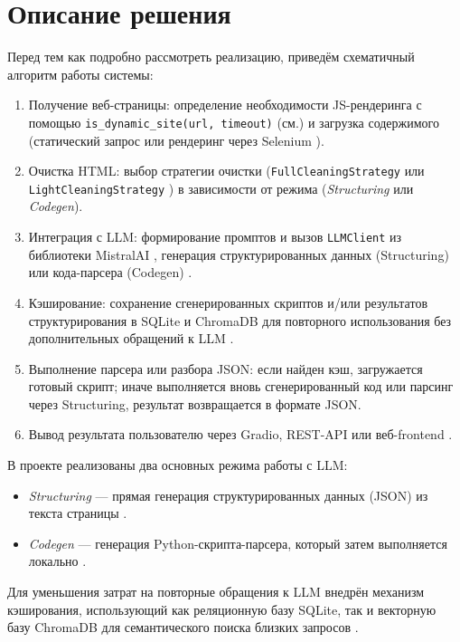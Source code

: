 
\section{Описание решения}

Перед тем как подробно рассмотреть реализацию, приведём схематичный алгоритм работы системы:
\begin{enumerate}
    \item Получение веб-страницы: определение необходимости JS-рендеринга с помощью \texttt{is\_dynamic\_site(url, timeout)} (см.\cite{PatilWebScraping2021, Smith2022}) и загрузка содержимого (статический запрос \cite{RequestsDocumentation} или рендеринг через Selenium \cite{SeleniumDocumentation}).
    \item Очистка HTML: выбор стратегии очистки (\texttt{FullCleaningStrategy} или \texttt{LightCleaningStrategy} \cite{Richardson2013, Brown2020}) в зависимости от режима (\emph{Structuring} или \emph{Codegen}).
    \item Интеграция с LLM: формирование промптов и вызов \texttt{LLMClient} из библиотеки MistralAI \cite{MistralAIDocumentation}, генерация структурированных данных (Structuring) или кода-парсера (Codegen) \cite{Kalyan2023, Li2024}.
    \item Кэширование: сохранение сгенерированных скриптов и/или результатов структурирования в SQLite и ChromaDB \cite{SQLiteDocumentation, ChromaDBDocumentation, Reimers2019} для повторного использования без дополнительных обращений к LLM \cite{Dong2022CacheLLM}.
    \item Выполнение парсера или разбора JSON: если найден кэш, загружается готовый скрипт; иначе выполняется вновь сгенерированный код или парсинг через Structuring, результат возвращается в формате JSON.
    \item Вывод результата пользователю через Gradio, REST-API или веб-frontend \cite{FastAPIDocumentation, GradioDocumentation, Jinja2Documentation}.
\end{enumerate}

В проекте реализованы два основных режима работы с LLM:
\begin{itemize}
    \item \emph{Structuring} — прямая генерация структурированных данных (JSON) из текста страницы \cite{Brown2020}.
    \item \emph{Codegen} — генерация Python-скрипта-парсера, который затем выполняется локально \cite{Dong2022CacheLLM}.
\end{itemize}
Для уменьшения затрат на повторные обращения к LLM внедрён механизм кэширования, использующий как реляционную базу SQLite, так и векторную базу ChromaDB для семантического поиска близких запросов \cite{Reimers2019, ChromaDBDocumentation}.

